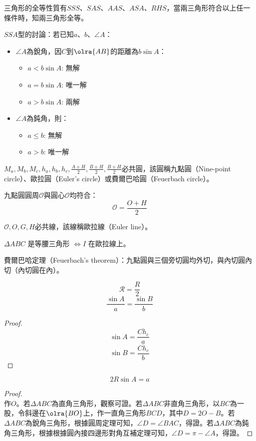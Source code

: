 \documentclass[a4paper,12pt]{report}
\begin{document}
三角形的全等性質有$SSS$、$SAS$、$AAS$、$ASA$、$RHS$，當兩三角形符合以上任一條件時，知兩三角形全等。

$SSA$型的討論：若已知$a$、$b$、$\angle A$：
\begin{itemize}
\item $\angle A$為銳角，因$C$到$\olra{AB}$的距離為$b\sin A$：
\begin{itemize}
\item $a<b\sin A$: 無解
\item $a=b\sin A$: 唯一解
\item $a>b\sin A$: 兩解
\end{itemize}
\item $\angle A$為鈍角，則：
\begin{itemize}
\item $a\leq b$: 無解
\item $a>b$: 唯一解
\end{itemize}
\end{itemize}
\bit
\item $M_a,M_b,M_c,h_a,h_b,h_c,\frac{A+H}{2},\frac{B+H}{2},\frac{B+H}{2}$必共圓，該圓稱九點圓（Nine-point circle）、歐拉圓（Euler's circle）或費爾巴哈圓（Feuerbach circle）。
\item 九點圓圓周$\mathscr{O}$與圓心$\mathscr{O}$均符合：
\[\mathscr{O}=\frac{O+H}{2}\]
\item $\mathscr{O},O,G,H$必共線，該線稱歐拉線（Euler line）。
\item $\Delta ABC$ 是等腰三角形 $\iff I$ 在歐拉線上。
\item 費爾巴哈定理（Feuerbach's theorem）：九點圓與三個旁切圓均外切，與內切圓內切（內切圓在內）。
\item \[\mathscr{R}=\frac{R}{2}\]
\eit
{}
\[\frac{\sin A}{a}=\frac{\sin B}{b}\]
\begin{proof}
\[\sin A=\frac{\overline{Ch_c}}{a}\]
\[\sin B=\frac{\overline{Ch_c}}{b}\]
\end{proof}
\[2R\sin A =a\]
\begin{proof}\mbox{}\\
作$O$。若$\Delta ABC$為直角三角形，觀察可證。若$\Delta ABC$非直角三角形，以$BC$為一股，令斜邊在$\olra{BO}$上，作一直角三角形$BCD$，其中$D=2O-B$。若$\Delta ABC$為銳角三角形，根據圓周定理可知，$\angle D = \angle BAC$，得證。若$\Delta ABC$為鈍角三角形，根據根據圓內接四邊形對角互補定理可知，$\angle D = \pi- \angle A$，得證。
\end{proof}
\end{document}
